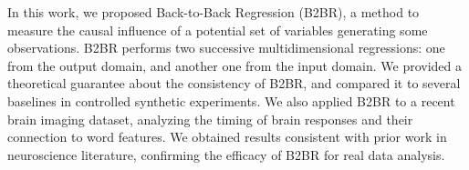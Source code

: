 In this work, we proposed Back-to-Back Regression (B2BR), a method to 
measure the causal influence of a potential set of variables generating some observations.
%
B2BR performs two successive multidimensional regressions: one from the output domain, and another one from the input domain.
%
We provided a theoretical guarantee about the consistency of B2BR, and compared it to several baselines in controlled synthetic experiments.
%
We also applied B2BR to a recent brain imaging dataset, analyzing the timing
of brain responses and their connection to word features.
%
We obtained results consistent with prior work in neuroscience literature, confirming the efficacy of B2BR for real data analysis.
